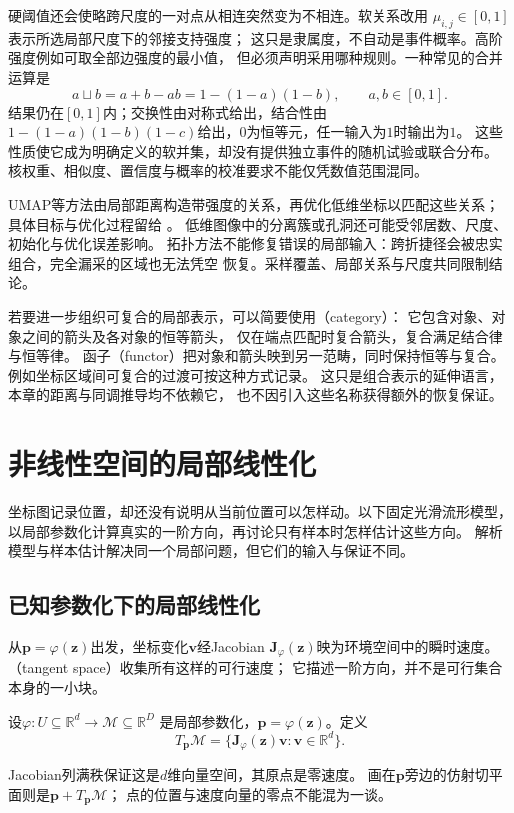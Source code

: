 硬阈值还会使略跨尺度的一对点从相连突然变为不相连。软关系改用
$\mu_{i,j}\in[0,1]$表示所选局部尺度下的邻接支持强度；
这只是隶属度，不自动是事件概率。高阶强度例如可取全部边强度的最小值，
但必须声明采用哪种规则。一种常见的合并运算是
\begin{equation}
 a\mathbin{\sqcup}b=a+b-ab=1-(1-a)(1-b),\qquad a,b\in[0,1].
 \label{eq:geometry-fuzzy-union}
\end{equation}
结果仍在$[0,1]$内；交换性由对称式给出，结合性由
$1-(1-a)(1-b)(1-c)$给出，$0$为恒等元，任一输入为$1$时输出为$1$。
这些性质使它成为明确定义的软并集，却没有提供独立事件的随机试验或联合分布。
核权重、相似度、置信度与概率的校准要求不能仅凭数值范围混同。

UMAP等方法由局部距离构造带强度的关系，再优化低维坐标以匹配这些关系；
具体目标与优化过程留给
。
低维图像中的分离簇或孔洞还可能受邻居数、尺度、初始化与优化误差影响。
拓扑方法不能修复错误的局部输入：跨折捷径会被忠实组合，完全漏采的区域也无法凭空
恢复。采样覆盖、局部关系与尺度共同限制结论。

若要进一步组织可复合的局部表示，可以简要使用（category）：
它包含对象、对象之间的箭头及各对象的恒等箭头，
仅在端点匹配时复合箭头，复合满足结合律与恒等律。
函子（functor）把对象和箭头映到另一范畴，同时保持恒等与复合。
例如坐标区域间可复合的过渡可按这种方式记录。
这只是组合表示的延伸语言，本章的距离与同调推导均不依赖它，
也不因引入这些名称获得额外的恢复保证。

\section{非线性空间的局部线性化}
\label{sec:geometry-manifold-local-linearization}

坐标图记录位置，却还没有说明从当前位置可以怎样动。以下固定光滑流形模型，
以局部参数化计算真实的一阶方向，再讨论只有样本时怎样估计这些方向。
解析模型与样本估计解决同一个局部问题，但它们的输入与保证不同。

\subsection{已知参数化下的局部线性化}
\label{sec:geometry-analytic-local-linearization}

从$\bm p=\varphi(\bm z)$出发，坐标变化$\bm v$经Jacobian
$\bm J_\varphi(\bm z)$映为环境空间中的瞬时速度。
（tangent space）收集所有这样的可行速度；
它描述一阶方向，并不是可行集合本身的一小块。

\begin{definition}[嵌入流形的切空间]
\label{def:geometry-tangent-space}
设$\varphi:U\subseteq\mathbb R^d\to\mathcal M\subseteq\mathbb R^D$
是局部参数化，$\bm p=\varphi(\bm z)$。定义
\begin{equation}
 T_{\bm p}\mathcal M
 =\{\bm J_\varphi(\bm z)\bm v:\bm v\in\mathbb R^d\}.
 \label{eq:geometry-tangent-space-chart}
\end{equation}
\end{definition}
Jacobian列满秩保证这是$d$维向量空间，其原点是零速度。
画在$\bm p$旁边的仿射切平面则是$\bm p+T_{\bm p}\mathcal M$；
点的位置与速度向量的零点不能混为一谈。

